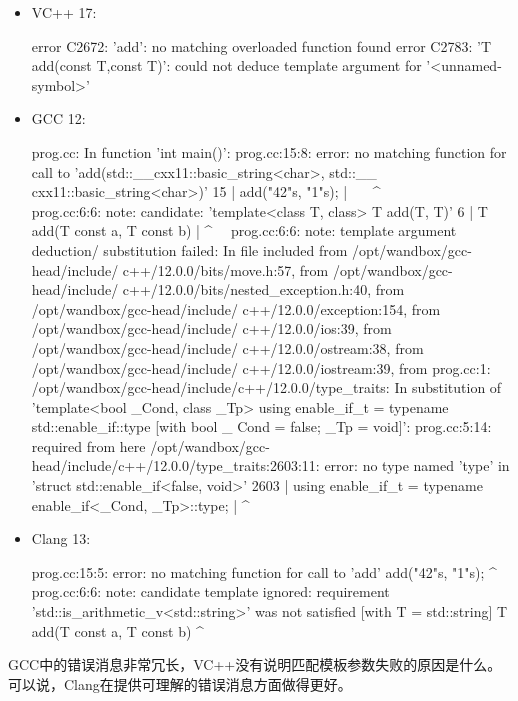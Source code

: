 \begin{itemize}
\item
VC++ 17:

\begin{shell}
error C2672: 'add': no matching overloaded function found
error C2783: 'T add(const T,const T)': could not deduce
template argument for '<unnamed-symbol>'
\end{shell}

\item
GCC 12:
\begin{shell}
prog.cc: In function 'int main()':
prog.cc:15:8: error: no matching function for call
to 'add(std::__cxx11::basic_string<char>, std::__
cxx11::basic_string<char>)'
15 |         add("42"s, "1"s);
   |       ~~~^~~~~~~~~~~~~
prog.cc:6:6: note: candidate: 'template<class T, class> T
add(T, T)'
6 | T add(T const a, T const b)
  |     ^~~
prog.cc:6:6: note: template argument deduction/
substitution failed:
In file included from /opt/wandbox/gcc-head/include/
c++/12.0.0/bits/move.h:57,
                 from /opt/wandbox/gcc-head/include/
c++/12.0.0/bits/nested_exception.h:40,
                 from /opt/wandbox/gcc-head/include/
c++/12.0.0/exception:154,
                 from /opt/wandbox/gcc-head/include/
c++/12.0.0/ios:39,
                 from /opt/wandbox/gcc-head/include/
c++/12.0.0/ostream:38,
                 from /opt/wandbox/gcc-head/include/
c++/12.0.0/iostream:39,
                 from prog.cc:1:
/opt/wandbox/gcc-head/include/c++/12.0.0/type_traits: In
substitution of 'template<bool _Cond, class _Tp> using
enable_if_t = typename std::enable_if::type [with bool _
Cond = false; _Tp = void]':
prog.cc:5:14: required from here
/opt/wandbox/gcc-head/include/c++/12.0.0/type_traits:2603:11:
error: no type named 'type' in 'struct std::enable_if<false, 
void>'
2603 | using enable_if_t = typename enable_if<_Cond, _Tp>::type;
     |            ^~~~~~~~~~~
\end{shell}

\item
Clang 13:
\begin{shell}
prog.cc:15:5: error: no matching function for call to
'add'
    add("42"s, "1"s);
    ^~~
prog.cc:6:6: note: candidate template ignored:
requirement 'std::is_arithmetic_v<std::string>' was not
satisfied [with T = std::string]
   T add(T const a, T const b)
      ^
\end{shell}
\end{itemize}

GCC中的错误消息非常冗长，VC++没有说明匹配模板参数失败的原因是什么。可以说，Clang在提供可理解的错误消息方面做得更好。

